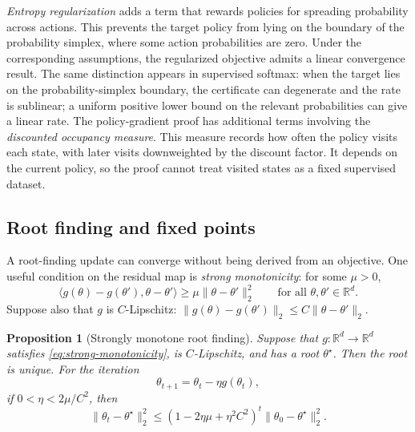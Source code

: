 \documentclass[11pt,twoside]{article}
\newcommand{\R}{\mathbb R}
\newtheorem{proposition}[theorem]{Proposition}
\theoremstyle{definition}
\theoremstyle{remark}
\begin{document}
\emph{Entropy regularization} adds a term that rewards policies for spreading
probability across actions. This prevents the target policy from lying on the
boundary of the probability simplex, where some action probabilities are
zero. Under the corresponding
assumptions, the regularized objective admits a linear convergence result.
The same distinction appears in supervised softmax: when the target lies on
the probability-simplex boundary, the certificate can degenerate and the rate
is sublinear; a uniform positive lower bound on the relevant probabilities can
give a linear rate. The policy-gradient proof has additional terms involving
the \emph{discounted occupancy measure}. This measure records how often the
policy visits each state, with later visits downweighted by the discount
factor. It depends on the current policy, so the proof cannot treat visited
states as a fixed supervised dataset.

\subsection{Root finding and fixed points}
\label{sec:root-finding}

A root-finding update can converge without being derived from an objective.
One useful condition on the residual map is \emph{strong monotonicity}: for
some $\mu>0$,
\begin{equation}
 \langle g(\theta)-g(\theta'),\theta-\theta'\rangle
 \ge \mu\|\theta-\theta'\|_2^2
 \qquad\text{for all $\theta,\theta'\in\R^d$.}
 \label{eq:strong-monotonicity}
\end{equation}
Suppose also that $g$ is $C$-Lipschitz:
$\|g(\theta)-g(\theta')\|_2\le C\|\theta-\theta'\|_2$.

\begin{proposition}[Strongly monotone root finding]
\label{prop:strongly-monotone-root}
Suppose that $g:\R^d\to\R^d$ satisfies
\cref{eq:strong-monotonicity}, is $C$-Lipschitz, and has a root
$\theta^\star$. Then the root is unique. For the iteration
\begin{equation}
 \theta_{t+1}=\theta_t-\eta g(\theta_t),
 \label{eq:root-finding-update}
\end{equation}
if $0<\eta<2\mu/C^2$, then
\begin{equation}
 \|\theta_t-\theta^\star\|_2^2
 \le \left(1-2\eta\mu+\eta^2C^2\right)^t
      \|\theta_0-\theta^\star\|_2^2.
 \label{eq:strongly-monotone-root-rate}
\end{equation}
\end{proposition}
\end{document}
